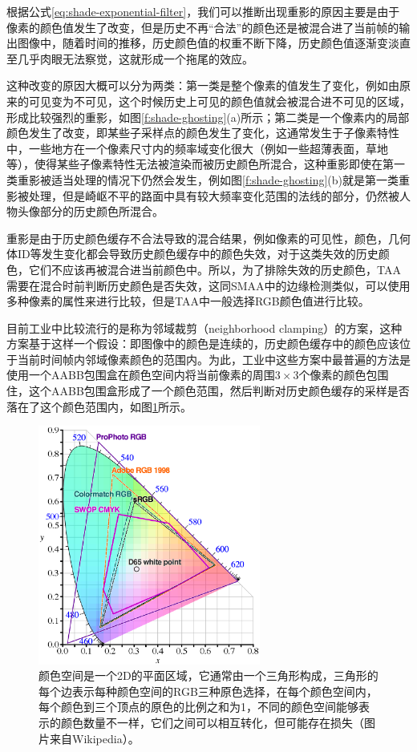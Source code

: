 根据公式\ref{eq:shade-exponential-filter}，我们可以推断出现重影的原因主要是由于像素的颜色值发生了改变，但是历史不再“合法”的颜色还是被混合进了当前帧的输出图像中，随着时间的推移，历史颜色值的权重不断下降，历史颜色值逐渐变淡直至几乎肉眼无法察觉，这就形成一个拖尾的效应。

这种改变的原因大概可以分为两类：第一类是整个像素的值发生了变化，例如由原来的可见变为不可见，这个时候历史上可见的颜色值就会被混合进不可见的区域，形成比较强烈的重影，如图\ref{f:shade-ghosting}(a)所示；第二类是一个像素内的局部颜色发生了改变，即某些子采样点的颜色发生了变化，这通常发生于子像素特性中，一些地方在一个像素尺寸内的频率域变化很大（例如一些超薄表面，草地等），使得某些子像素特性无法被渲染而被历史颜色所混合，这种重影即使在第一类重影被适当处理的情况下仍然会发生，例如图\ref{f:shade-ghosting}(b)就是第一类重影被处理，但是崎岖不平的路面中具有较大频率变化范围的法线的部分，仍然被人物头像部分的历史颜色所混合。

重影是由于历史颜色缓存不合法导致的混合结果，例如像素的可见性，颜色，几何体ID等发生变化都会导致历史颜色缓存中的颜色失效，对于这类失效的历史颜色，它们不应该再被混合进当前颜色中。所以，为了排除失效的历史颜色，TAA需要在混合时前判断历史颜色是否失效，这同SMAA中的边缘检测类似，可以使用多种像素的属性来进行比较，但是TAA中一般选择RGB颜色值进行比较。

目前工业中\cite{a:AnExcursioninTemporalSupersampling,a:RealtimeglobalilluminationandreflectionsinDust514,a:TemporalAntialiasingInUncharted4,a:TemporalReprojectionAnti-AliasinginINSIDE}比较流行的是称为邻域裁剪（neighborhood clamping）的方案，这种方案基于这样一个假设：即图像中的颜色是连续的，历史颜色缓存中的颜色应该位于当前时间帧内邻域像素颜色的范围内。为此，工业中这些方案中最普遍的方法是使用一个AABB包围盒在颜色空间内将当前像素的周围$3\times 3$个像素的颜色包围住，这个AABB包围盒形成了一个颜色范围，然后判断对历史颜色缓存的采样是否落在了这个颜色范围内，如图\ref{f:shade-clamping}所示。

\begin{figure}
\sidecaption
	\includegraphics[width=0.65\textwidth]{figures/shade/color-space}
	\caption{颜色空间是一个2D的平面区域，它通常由一个三角形构成，三角形的每个边表示每种颜色空间的RGB三种原色选择，在每个颜色空间内，每个颜色到三个顶点的原色的比例之和为1，不同的颜色空间能够表示的颜色数量不一样，它们之间可以相互转化，但可能存在损失（图片来自Wikipedia）。}
	\label{f:shade-clamping}
\end{figure}

